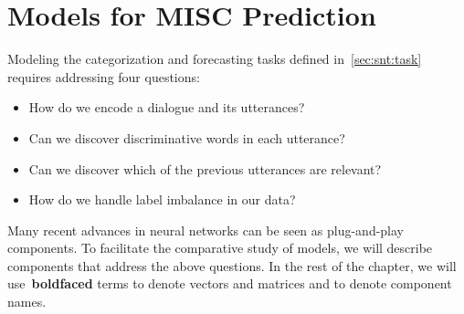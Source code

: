 \section{Models for MISC Prediction}
\label{sec:snt:devices}

Modeling the categorization and forecasting tasks defined in~\autoref{sec:snt:task} requires
addressing four questions:
\begin{itemize}
\item How do we encode a dialogue and its utterances?
\item Can we discover discriminative words in each utterance?
\item Can we discover which of the previous utterances are relevant?
\item How do we handle label imbalance in our data?
\end{itemize}
%
Many recent advances in neural networks can be seen as plug-and-play
components. To facilitate the comparative study of models, we will
describe components that address the above questions.  %
%
In the rest of the chapter, we will use~\textbf{boldfaced} terms to
denote vectors and matrices and  to denote
component names.

%












%

